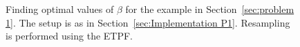 \documentclass[final]{siamltex}
\begin{document}
\begin{figure}[htb]
\centering
{}
\caption{Finding optimal values of $\beta$ for the example in Section~\ref{sec:problem 1}. The setup is as in Section~\ref{sec:Implementation P1}. Resampling is performed using the ETPF.}
\label{fig:P1 opt beta}
\end{figure}
\end{document}
